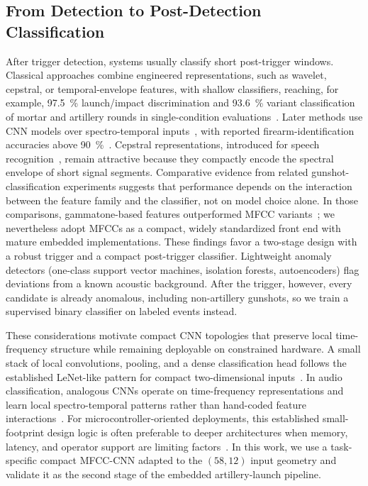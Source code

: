 ﻿\documentclass[conference]{IEEEtran}
\begin{document}
\subsection{From Detection to Post-Detection Classification}
After trigger detection, systems usually classify short post-trigger windows. Classical approaches combine engineered representations, such as wavelet, cepstral, or temporal-envelope features, with shallow classifiers, reaching, for example, 97.5~\% launch/impact discrimination and 93.6~\% variant classification of mortar and artillery rounds in single-condition evaluations~\cite{desai2006launch_impact,hohil2007variants}. Later methods use CNN models over spectro-temporal inputs~\cite{piczak2015esc_cnn,salamon2017esc_aug}, with reported firearm-identification accuracies above 90~\%~\cite{raponi2022sound_of_guns}. Cepstral representations, introduced for speech recognition~\cite{davis1980mfcc}, remain attractive because they compactly encode the spectral envelope of short signal segments. Comparative evidence from related gunshot-classification experiments suggests that performance depends on the interaction between the feature family and the classifier, not on model choice alone. In those comparisons, gammatone-based features outperformed MFCC variants~\cite{svatos2024fcc}; we nevertheless adopt MFCCs as a compact, widely standardized front end with mature embedded implementations. These findings favor a two-stage design with a robust trigger and a compact post-trigger classifier. Lightweight anomaly detectors (one-class support vector machines, isolation forests, autoencoders) flag deviations from a known acoustic background. After the trigger, however, every candidate is already anomalous, including non-artillery gunshots, so we train a supervised binary classifier on labeled events instead.

These considerations motivate compact CNN topologies that preserve local time-frequency structure while remaining deployable on constrained hardware. A small stack of local convolutions, pooling, and a dense classification head follows the established LeNet-like pattern for compact two-dimensional inputs~\cite{lecun1998gradient}. In audio classification, analogous CNNs operate on time-frequency representations and learn local spectro-temporal patterns rather than hand-coded feature interactions~\cite{piczak2015esc_cnn,hershey2017cnn_audio}. For microcontroller-oriented deployments, this established small-footprint design logic is often preferable to deeper architectures when memory, latency, and operator support are limiting factors~\cite{banbury2021micronets}. In this work, we use a task-specific compact MFCC-CNN adapted to the $(58,12)$ input geometry and validate it as the second stage of the embedded artillery-launch pipeline.
\end{document}

